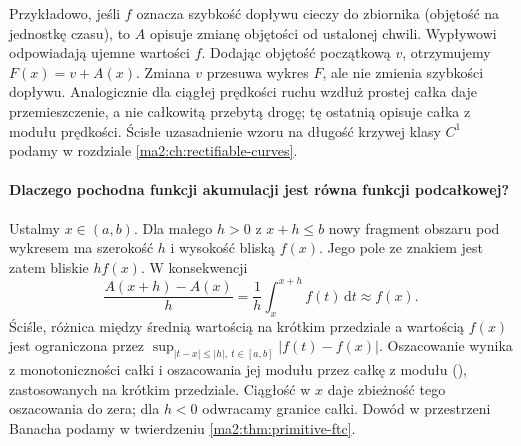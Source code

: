 Przykładowo, jeśli $f$ oznacza szybkość
dopływu cieczy do zbiornika (objętość na
jednostkę czasu), to $A$ opisuje zmianę
objętości od ustalonej chwili. Wypływowi
odpowiadają ujemne wartości $f$.
Dodając objętość początkową $v$, otrzymujemy
$F(x)=v+A(x)$. Zmiana $v$ przesuwa wykres
$F$, ale nie zmienia szybkości dopływu.
Analogicznie dla ciągłej prędkości ruchu
wzdłuż prostej całka daje przemieszczenie,
a nie całkowitą przebytą drogę; tę ostatnią
opisuje całka z modułu prędkości. Ścisłe
uzasadnienie wzoru na długość krzywej
klasy $C^1$ podamy w rozdziale
\ref{ma2:ch:rectifiable-curves}.

\paragraph{Dlaczego pochodna funkcji akumulacji jest równa
funkcji podcałkowej?}
Ustalmy $x\in(a,b)$. Dla małego $h>0$
z $x+h\le b$ nowy fragment obszaru
pod wykresem ma szerokość $h$ i wysokość
bliską $f(x)$. Jego pole ze znakiem jest
zatem bliskie $hf(x)$. W konsekwencji
\[
 \frac{A(x+h)-A(x)}h
 =\frac1h\int_x^{x+h}f(t)\,\mathrm dt
 \approx f(x).
\]
Ściśle, różnica między średnią wartością
na krótkim przedziale a wartością $f(x)$
jest ograniczona przez
$\sup_{|t-x|\le |h|,\ t\in[a,b]}|f(t)-f(x)|$.
Oszacowanie wynika z monotoniczności
całki i oszacowania jej modułu przez
całkę z modułu (),
zastosowanych na krótkim przedziale.
Ciągłość w $x$ daje zbieżność tego
oszacowania do zera; dla $h<0$ odwracamy
granice całki. Dowód w przestrzeni Banacha
podamy w twierdzeniu \ref{ma2:thm:primitive-ftc}.

